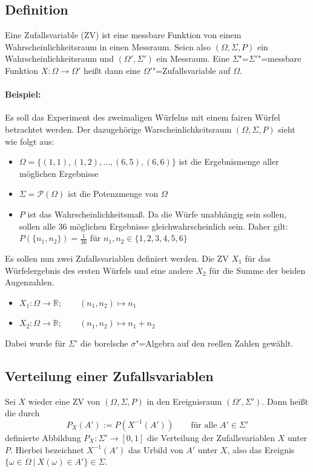 \documentclass[paper=a4,10pt]{scrartcl}
\begin{document}
\subsection{Definition}
Eine Zufallsvariable (ZV) ist eine messbare Funktion von einem Wahrscheinlichkeitsraum in einen Messraum. Seien also $(\Omega, \Sigma , P)$ ein Wahrscheinlichkeitsraum und $(\Omega', \Sigma')$ ein Messraum. Eine $\Sigma$"=$\Sigma'$"=messbare Funktion $X:\Omega \rightarrow \Omega'$ heißt dann eine $\Omega'$"=Zufallsvariable auf $\Omega$.

\paragraph{Beispiel:} Es soll das Experiment des zweimaligen Würfelns mit einem fairen Würfel betrachtet werden. Der dazugehörige Warscheinlichkeitsraum $(\Omega, \Sigma, P)$ sieht wie folgt aus:

\begin{itemize}
\item $\Omega = \{ (1,1), (1,2), \dots, (6,5), (6,6) \}$ ist die Ergebnismenge aller möglichen Ergebnisse
\item $\Sigma = \mathcal{P}(\Omega)$ ist die Potenzmenge von $\Omega$
\item $P$ ist das Wahrscheinlichkeitsmaß. Da die Würfe unabhängig sein sollen, sollen alle 36 möglichen Ergebnisse gleichwahrscheinlich sein. Daher gilt: $P(\{ n_1, n_2\}) = \frac{1}{36}$ für $n_1, n_2 \in \{ 1,2,3,4,5,6\}$
\end{itemize}

\noindent
Es sollen nun zwei Zufallsvariablen definiert werden. Die ZV $X_1$ für das Würfelergebnis des ersten Würfels und eine andere $X_2$ für die Summe der beiden Augenzahlen.

\begin{itemize}
\item $X_1: \Omega \rightarrow \mathbb{R}; \qquad (n_1, n_2) \mapsto n_1$
\item $X_2: \Omega \rightarrow \mathbb{R}; \qquad (n_1, n_2) \mapsto n_1 + n_2$
\end{itemize}
Dabei wurde für $\Sigma'$ die borelsche $\sigma$"=Algebra auf den reellen Zahlen gewählt.

\subsection{Verteilung einer Zufallsvariablen}
Sei $X$ wieder eine ZV von $(\Omega, \Sigma, P)$ in den Ereignisraum $(\Omega', \Sigma')$. Dann heißt die durch
\begin{equation}
P_X(A') := P(X^{-1}(A')) \qquad \text{für alle }A' \in \Sigma' 
\end{equation}
definierte Abbildung $P_X: \Sigma' \rightarrow [0, 1]$ die Verteilung der Zufallsvariablen $X$ unter $P$. Hierbei bezeichnet $X^{-1}(A')$ das Urbild von $A'$ unter $X$, also das Ereignis
$\{ \omega \in \Omega \ | \ X(\omega) \in A' \} \in \Sigma$. \\
\end{document}
